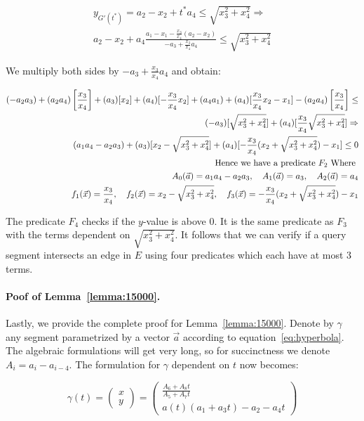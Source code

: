 \documentclass[UKenglish]{lipics-v2019}
\begin{document}
\begin{align*}
    y_{G'(t^*)} = a_2 - x_2 + t^* a_4   \le \sqrt{x_3^2 + x_4^2} \Rightarrow \\
    a_2 - x_2 + a_4 \frac{   a_1 - x_1 - \frac{x_3}{x_4} (a_2 - x_2)}{ - a_3 + \frac{x_3}{x_4}a_4} \le \sqrt{x_3^2 + x_4^2} 
\end{align*}

We multiply both sides by $- a_3 + \frac{x_3}{x_4}a_4$ and obtain:


\begin{align*}
    (- a_2 a_3) +  (a_2 a_4) \left[\frac{x_3}{x_4}\right] +  (a_3)[x_2] + (a_4)[ - \frac{x_3}{x_4}x_2] + (a_4 a_1) + (a_4)[ \frac{x_3}{x_4}x_2 - x_1] - (a_2a_4)\left[\frac{x_3}{x_4}\right]
        \le \\
    (- a_3)[ \sqrt{x_3^2 + x_4^2} ] + (a_4) [\frac{x_3}{x_4} \sqrt{x_3^2 + x_4^2}] \Rightarrow \\
    (a_1 a_4 - a_2 a_3) + (a_3)[x_2 - \sqrt{x_3^2 + x_4^2}] + (a_4)[ - \frac{x_3}{x_4}( x_2 + \sqrt{x_3^2 + x_4^2}) -x_1 ] \le 0 \\
    \textnormal{Hence we have a predicate } F_2 \textnormal{ Where } \\
    A_0(\vec{a}) = a_1 a_4 - a_2 a_3, \quad A_1(\vec{a}) = a_3, \quad A_2(\vec{a}) = a_4 \\
   f_1(\vec{x}) = \frac{x_3}{x_4}, \quad f_2(\vec{x}) =  x_2 - \sqrt{x_3^2 + x_4^2}, \quad f_3(\vec{x}) = - \frac{x_3}{x_4}( x_2 + \sqrt{x_3^2 + x_4^2}) -x_1
\end{align*}

The predicate $F_4$ checks if the $y$-value is above $0$. It is the same predicate as $F_3$ with the terms dependent on $\sqrt{x_3^2 + x_4^2}$. It follows that we can verify if a query segment intersects an edge in $E$ using four predicates which each have at most 3 terms. 

\paragraph*{Poof of Lemma~\ref{lemma:15000}.}

Lastly, we provide the complete proof for Lemma~\ref{lemma:15000}. Denote by $\gamma$ any segment parametrized by a vector $\vec{a}$ according to equation~\ref{eq:hyperbola}. The algebraic formulations will get very long, so for succinctness we denote $A_i = a_i - a_{i-4}$. The formulation for $\gamma$ dependent on $t$ now becomes:

\begin{equation}
  \gamma(t) = \left( \begin{array}{c}
         x  \\
         y 
    \end{array}  \right) =  
        \left( \begin{array}{c}
         \frac{ A_6 + A_8 t}
      { A_5  + A_7 t } \\
         a(t)(a_1 +  a_3 t) - a_2 -  a_4 t 
    \end{array}  \right)
\end{equation}
\end{document}
